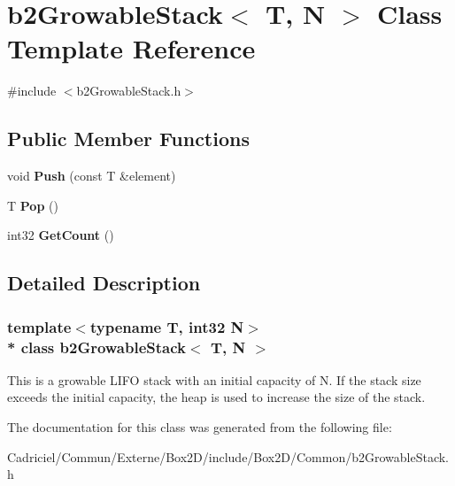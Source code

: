\hypertarget{classb2_growable_stack}{}\section{b2\+Growable\+Stack$<$ T, N $>$ Class Template Reference}
\label{classb2_growable_stack}


{\ttfamily \#include $<$b2\+Growable\+Stack.\+h$>$}

\subsection*{Public Member Functions}
\begin{DoxyCompactItemize}
\item 
void {\bfseries Push} (const T \&element)\hypertarget{classb2_growable_stack_a23661327d64ff72d1ec8d6bcdb6d8992}{}\label{classb2_growable_stack_a23661327d64ff72d1ec8d6bcdb6d8992}

\item 
T {\bfseries Pop} ()\hypertarget{classb2_growable_stack_a53e53dcd6bff8308405a881f02957bc8}{}\label{classb2_growable_stack_a53e53dcd6bff8308405a881f02957bc8}

\item 
int32 {\bfseries Get\+Count} ()\hypertarget{classb2_growable_stack_a3049e76ba7182b988450bfe94d30d5aa}{}\label{classb2_growable_stack_a3049e76ba7182b988450bfe94d30d5aa}

\end{DoxyCompactItemize}


\subsection{Detailed Description}
\subsubsection*{template$<$typename T, int32 N$>$\\*
class b2\+Growable\+Stack$<$ T, N $>$}

This is a growable L\+I\+FO stack with an initial capacity of N. If the stack size exceeds the initial capacity, the heap is used to increase the size of the stack. 

The documentation for this class was generated from the following file\+:\begin{DoxyCompactItemize}
\item 
Cadriciel/\+Commun/\+Externe/\+Box2\+D/include/\+Box2\+D/\+Common/b2\+Growable\+Stack.\+h\end{DoxyCompactItemize}
